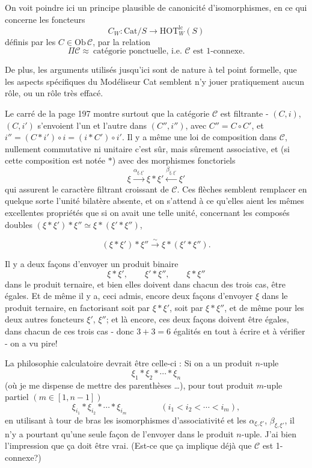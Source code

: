 \documentclass[11pt]{article}
\newcommand{\printedpage}[1]{\marginpar{\footnotesize p.~#1}}
\newcommand{\msp}[1]{\marginpar{\footnotesize [#1]}}
\newcommand{\Cat}{\mathrm{Cat}}
\newcommand{\HOT}{\mathrm{HOT}}
\begin{document}
On voit poindre ici un principe plausible de canonicité d'isomorphismes, en ce qui concerne les foncteurs
\[
C_W : \Cat/S \longrightarrow \HOT^{\mathrm{lc}}_W(S)
\]
définis par les $C \in \mathrm{Ob}\,\mathcal{C}$, par la relation
\[
\Pi\mathcal{C} \approx \ \text{catégorie ponctuelle, i.e. } \mathcal{C} \text{ est 1-connexe.}
\]

De plus, les arguments utilisés jusqu'ici sont de nature à tel point formelle, que les aspects spécifiques du Modéliseur Cat
\printedpage{132}
\msp{page 201}semblent n'y jouer pratiquement aucun rôle, ou un rôle très effacé.

Le carré de la page 197 montre surtout que la catégorie $\mathcal{C}$ est filtrante - $(C,i)$, $(C,i')$ s'envoient l'un et l'autre dans $(C'',i'')$, avec $C'' = C \circ C'$, et $i'' = (C * i') \circ i = (i * C') \circ i'$. Il y a même une loi de composition dans $\mathcal{C}$, nullement commutative ni unitaire c'est sûr, mais sûrement associative, et (si cette composition est notée $*$) avec des morphismes fonctoriels %
\[
\xi \xrightarrow{\alpha_{\xi,\xi'}} \xi * \xi' \xleftarrow{\beta_{\xi,\xi'}} \xi'
\]
qui assurent le caractère filtrant croissant de $\mathcal{C}$. Ces flèches semblent remplacer en quelque sorte l'unité bilatère absente, et on s'attend à ce qu'elles aient les mêmes excellentes propriétés que si on avait une telle unité, concernant les composés doubles $(\xi * \xi') * \xi'' \simeq \xi * (\xi' * \xi'')$,

\msp{page 202}
\[
(\xi * \xi') * \xi'' \xrightarrow{\sim} \xi * (\xi' * \xi'').
\]

Il y a deux façons d'envoyer un produit binaire
\[
\xi * \xi', \qquad \xi' * \xi'', \qquad \xi * \xi''
\]
dans le produit ternaire, et bien elles doivent dans chacun des trois cas, être égales. Et de même il y a, ceci admis, encore deux façons d'envoyer $\xi$ dans le produit ternaire, en factorisant soit par $\xi * \xi'$, soit par $\xi * \xi''$, et de même pour les deux autres foncteurs $\xi'$, $\xi''$; et là encore, ces deux façons doivent être égales, dans chacun de ces trois cas - donc $3 + 3 = 6$ égalités en tout à écrire et à vérifier - on a vu pire!

La philosophie calculatoire devrait être celle-ci : Si on a un produit $n$-uple
\[
\xi_1 * \xi_2 * \cdots * \xi_n
\]
(où je me dispense de mettre des parenthèses \dots), pour tout produit $m$-uple partiel $(m \in [1, n-1])$\msp{page 203}
\[
\xi_{i_1} * \xi_{i_2} * \cdots * \xi_{i_m} \qquad\qquad (i_1 < i_2 < \cdots < i_m),
\]
en utilisant à tour de bras les isomorphismes d'associativité et les $\alpha_{\xi,\xi'}$, $\beta_{\xi,\xi'}$, il n'y a pourtant qu'une seule façon de l'envoyer dans le produit $n$-uple. J'ai bien l'impression que ça doit être vrai. (Est-ce que ça implique déjà que $\mathcal{C}$ est 1-connexe?)
\end{document}
